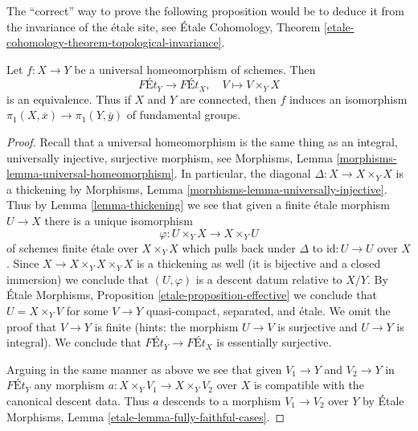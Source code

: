 \noindent
The ``correct'' way to prove the following proposition would be to
deduce it from the invariance of the \'etale site, see
\'Etale Cohomology, Theorem
\ref{etale-cohomology-theorem-topological-invariance}.

\begin{proposition}
\label{proposition-universal-homeomorphism}
Let $f : X \to Y$ be a universal homeomorphism of schemes. Then
$$
\textit{F\'Et}_Y \longrightarrow \textit{F\'Et}_X,\quad
V \longmapsto V \times_Y X
$$
is an equivalence. Thus if $X$ and $Y$ are connected, then
$f$ induces an isomorphism $\pi_1(X, \overline{x}) \to \pi_1(Y, \overline{y})$
of fundamental groups.
\end{proposition}

\begin{proof}
Recall that a universal homeomorphism is the same thing as an
integral, universally injective, surjective morphism, see
Morphisms, Lemma \ref{morphisms-lemma-universal-homeomorphism}.
In particular, the diagonal $\Delta : X \to X \times_Y X$ is a thickening
by Morphisms, Lemma \ref{morphisms-lemma-universally-injective}.
Thus by Lemma \ref{lemma-thickening}
we see that given a finite \'etale morphism $U \to X$
there is a unique isomorphism
$$
\varphi : U \times_Y X \to X \times_Y U
$$
of schemes finite \'etale over $X \times_Y X$ which pulls back under
$\Delta$ to $\text{id} : U \to U$ over $X$.
Since $X \to X \times_Y X \times_Y X$
is a thickening as well (it is bijective and a closed immersion)
we conclude that $(U, \varphi)$ is a descent datum relative to $X/Y$.
By \'Etale Morphisms, Proposition \ref{etale-proposition-effective}
we conclude that $U = X \times_Y V$ for some $V \to Y$
quasi-compact, separated, and \'etale.
We omit the proof that $V \to Y$ is finite (hints:
the morphism $U \to V$ is surjective and $U \to Y$ is integral).
We conclude that $\textit{F\'Et}_Y \to \textit{F\'Et}_X$
is essentially surjective.

\medskip\noindent
Arguing in the same manner as above we see that given
$V_1 \to Y$ and $V_2 \to Y$ in $\textit{F\'Et}_Y$ any
morphism $a : X \times_Y V_1 \to X \times_Y V_2$ over $X$
is compatible with the canonical descent data. Thus $a$
descends to a morphism $V_1 \to V_2$ over $Y$ by
\'Etale Morphisms, Lemma \ref{etale-lemma-fully-faithful-cases}.
\end{proof}










